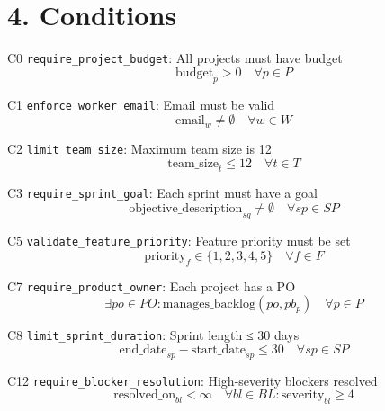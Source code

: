\documentclass[12pt]{article}
\begin{document}
\section{4. Conditions}
\item[C0] \texttt{require\_project\_budget}: All projects must have budget
    \[
    \text{budget}_p > 0 \quad \forall p \in P
    \]
    \item[C1] \texttt{enforce\_worker\_email}: Email must be valid
    \[
    \text{email}_w \neq \emptyset \quad \forall w \in W
    \]
    \item[C2] \texttt{limit\_team\_size}: Maximum team size is 12
    \[
    \text{team\_size}_t \leq 12 \quad \forall t \in T
    \]
    \item[C3] \texttt{require\_sprint\_goal}: Each sprint must have a goal
    \[
    \text{objective\_description}_{sg} \neq \emptyset \quad \forall sp \in SP
    \]
    \item[C5] \texttt{validate\_feature\_priority}: Feature priority must be set
    \[
    \text{priority}_f \in \{1,2,3,4,5\} \quad \forall f \in F
    \]
    \item[C7] \texttt{require\_product\_owner}: Each project has a PO
    \[
    \exists po \in PO : \text{manages\_backlog}(po, pb_p) \quad \forall p \in P
    \]
    \item[C8] \texttt{limit\_sprint\_duration}: Sprint length ≤ 30 days
    \[
    \text{end\_date}_{sp} - \text{start\_date}_{sp} \leq 30 \quad \forall sp \in SP
    \]
    \item[C12] \texttt{require\_blocker\_resolution}: High-severity blockers resolved
    \[
    \text{resolved\_on}_{bl} < \infty \quad \forall bl \in BL : \text{severity}_{bl} \geq 4
    \]
\end{document}
